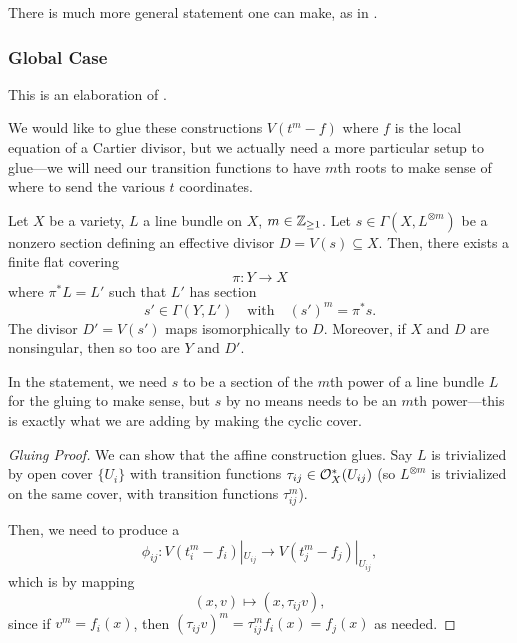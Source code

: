 \documentclass[12pt]{article}
\begin{document}
\begin{rmk}
    There is much more general statement one can make, as in \cite[Lemma~2.1]{hochster_infinite_1992}.
\end{rmk}



\subsubsection{Global Case}

This is an elaboration of \cite[Proposition~4.1.6]{lazarsfeld_positivity_2004}.

We would like to glue these constructions $V(t^m - f)$ where $f$ is the local equation of a Cartier divisor, but we actually need a more particular setup to glue---we will need our transition functions to have $m$th roots to make sense of where to send the various $t$ coordinates.

\begin{prop}
    Let $X$ be a variety, $L$ a line bundle on $X$, $m\in \mathbb{Z}_{\geq 1}$. Let $s\in \Gamma(X,L^{\otimes m})$ be a nonzero section defining an effective divisor $D=V(s)\subseteq X$. Then, there exists a finite flat covering
    \[\pi: Y\to X\]
    where $\pi^* L = L'$ such that $L'$ has section
    \[s' \in \Gamma(Y,L') \quad \text{with} \quad (s')^m = \pi^* s.\]
    The divisor $D' = V(s')$ maps isomorphically to $D$. Moreover, if $X$ and $D$ are nonsingular, then so too are $Y$ and $D'$.
\end{prop}

\begin{rmk}
    In the statement, we need $s$ to be a section of the $m$th power of a line bundle $L$ for the gluing to make sense, but $s$ by no means needs to be an $m$th power---this is exactly what we are adding by making the cyclic cover.
\end{rmk}

\begin{proof}[Gluing Proof]
    We can show that the affine construction glues. Say $L$ is trivialized by open cover $\{U_i\}$ with transition functions $\tau_{ij} \in \mathcal{O}_X^*(U_{ij})$ (so $L^{\otimes m}$ is trivialized on the same cover, with transition functions $\tau_{ij}^m$).

    Then, we need to produce a
    \[\phi_{ij}: V(t_i^m - f_i)|_{U_{ij}} \to V(t_j^m - f_j)|_{U_{ij}},\]
    which is by mapping
    \[(x,v) \mapsto (x,\tau_{ij} v),\]
    since if $v^m = f_i(x)$, then $(\tau_{ij} v)^m = \tau_{ij}^m f_i(x) = f_j(x)$ as needed. 
\end{proof}
\end{document}
